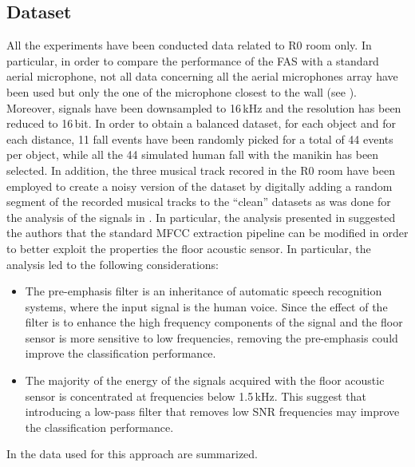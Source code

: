 \subsection{Dataset}
\label{sec:dataset_svm_multiclass}
All the experiments have been conducted data related to R0 room only. In particular, in order to compare the performance of the FAS with a standard aerial microphone, not all data concerning all the aerial microphones array have been used but only the one of the microphone closest to the wall (see ). Moreover, signals have been downsampled to 16\,kHz and the resolution has been reduced to 16\,bit. In order to obtain a balanced dataset, for each object and
for each distance, 11 fall events have been randomly picked for a total of 44 events per
object, while all the 44 simulated human fall with the manikin has been selected. In addition, the three musical track recored in the R0 room have been employed to create a noisy version of
the dataset by digitally adding a random segment of the recorded musical tracks
to the ``clean'' datasets as was done for the analysis of the signals in . In particular, the analysis presented in  suggested the authors that the standard MFCC extraction pipeline can be modified in order to better exploit the properties the floor acoustic sensor. In particular, the analysis led to the following considerations:
\begin{itemize}
	\item The pre-emphasis filter is an inheritance of automatic speech recognition systems, where the input signal is the human voice. Since the effect of the filter is to enhance the high frequency components of the signal and the floor sensor is more sensitive to low frequencies, removing the pre-emphasis could improve the classification performance.
	\item The majority of the energy of the signals acquired with the floor acoustic sensor is concentrated at frequencies below 1.5\,kHz. This suggest that introducing a low-pass filter that removes low SNR frequencies may improve the classification performance.
\end{itemize}
In  the data used for this approach are summarized.
